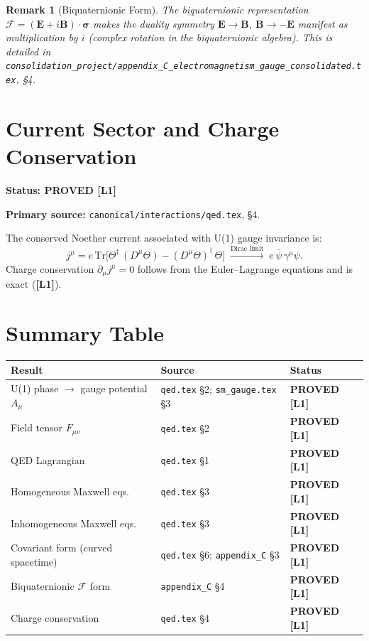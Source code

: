 \documentclass[11pt,a4paper]{article}
\newtheorem{remark}{Remark}
\newcommand{\Lone}{\textbf{[L1]}}
\newcommand{\PROVED}{\textbf{PROVED}}
\begin{document}
\begin{remark}[Biquaternionic Form]
The biquaternionic representation $\mathcal{F} = (\mathbf{E}+i\mathbf{B})\cdot\boldsymbol{\sigma}$
makes the duality symmetry $\mathbf{E}\to\mathbf{B}$, $\mathbf{B}\to-\mathbf{E}$ manifest
as multiplication by $i$ (complex rotation in the biquaternionic algebra).
This is detailed in
\texttt{consolidation\_project/appendix\_C\_electromagnetism\_gauge\_consolidated.tex}, \S4.
\end{remark}

\section{Current Sector and Charge Conservation}

\noindent\textbf{Status: \PROVED{} \Lone}

\noindent\textbf{Primary source:}
\texttt{canonical/interactions/qed.tex}, \S4.

\medskip

The conserved Noether current associated with U(1) gauge invariance is:
\begin{equation}
  j^\mu = e\,\mathrm{Tr}\bigl[\Theta^\dagger\,(D^\mu\Theta) - (D^\mu\Theta)^\dagger\,\Theta\bigr]
  \;\xrightarrow{\text{Dirac limit}}\;
  e\,\bar\psi\,\gamma^\mu\psi.
\end{equation}
Charge conservation $\partial_\mu j^\mu = 0$ follows from the Euler--Lagrange
equations and is exact (\Lone).

\section{Summary Table}

\begin{center}
\begin{tabular}{lll}
\hline
\textbf{Result} & \textbf{Source} & \textbf{Status} \\
\hline
U(1) phase $\to$ gauge potential $A_\mu$ & \texttt{qed.tex} \S2; \texttt{sm\_gauge.tex} \S3 & \PROVED{} \Lone \\
Field tensor $F_{\mu\nu}$ & \texttt{qed.tex} \S2 & \PROVED{} \Lone \\
QED Lagrangian & \texttt{qed.tex} \S1 & \PROVED{} \Lone \\
Homogeneous Maxwell eqs.\ & \texttt{qed.tex} \S3 & \PROVED{} \Lone \\
Inhomogeneous Maxwell eqs.\ & \texttt{qed.tex} \S3 & \PROVED{} \Lone \\
Covariant form (curved spacetime) & \texttt{qed.tex} \S6; \texttt{appendix\_C} \S3 & \PROVED{} \Lone \\
Biquaternionic $\mathcal{F}$ form & \texttt{appendix\_C} \S4 & \PROVED{} \Lone \\
Charge conservation & \texttt{qed.tex} \S4 & \PROVED{} \Lone \\
\hline
\end{tabular}
\end{center}
\end{document}
